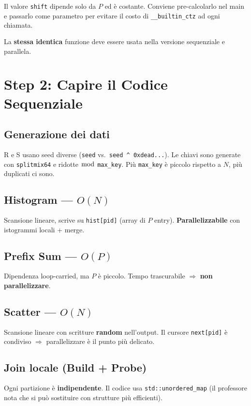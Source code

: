 \documentclass[11pt,a4paper]{article}
\begin{document}
\begin{notebox}[Ottimizzazione]
Il valore \texttt{shift} dipende solo da $P$ ed è costante. Conviene pre-calcolarlo nel main e passarlo come parametro per evitare il costo di \texttt{\_\_builtin\_ctz} ad ogni chiamata.
\end{notebox}

La \textbf{stessa identica} funzione deve essere usata nella versione sequenziale e parallela.

\section{Step 2: Capire il Codice Sequenziale}

\subsection{Generazione dei dati}
R e S usano seed diverse (\texttt{seed} vs.\ \texttt{seed \^{} 0xdead...}). Le chiavi sono generate con \texttt{splitmix64} e ridotte $\bmod$ \texttt{max\_key}. Più \texttt{max\_key} è piccolo rispetto a $N$, più duplicati ci sono.

\subsection{Histogram --- $O(N)$}
Scansione lineare, scrive su \texttt{hist[pid]} (array di $P$ entry). \textbf{Parallelizzabile} con istogrammi locali + merge.

\subsection{Prefix Sum --- $O(P)$}
Dipendenza loop-carried, ma $P$ è piccolo. Tempo trascurabile $\Rightarrow$ \textbf{non parallelizzare}.

\subsection{Scatter --- $O(N)$}
Scansione lineare con scritture \textbf{random} nell'output. Il cursore \texttt{next[pid]} è condiviso $\Rightarrow$ parallelizzare è il punto più delicato.

\subsection{Join locale (Build + Probe)}
Ogni partizione è \textbf{indipendente}. Il codice usa \texttt{std::unordered\_map} (il professore nota che si può sostituire con strutture più efficienti).
\end{document}
